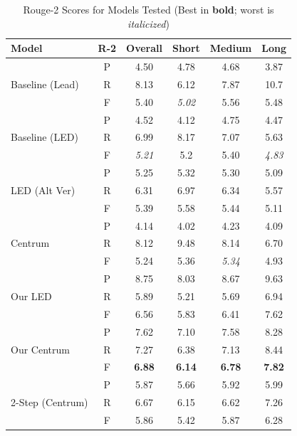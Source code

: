 \documentclass[12pt, twocolumn]{article}
\numberwithin{equation}{section}
\begin{document}
\begin{table}
    \centering
    \footnotesize
    \begin{tabular}{|p{1.5cm}|c|c|c|c|c|}
    \hline
        Model & R-2 & Overall & Short & Medium & Long \\ \hline
        \multirow{3}{1.5cm}{Baseline (Lead)} & P & 4.50 & 4.78 & 4.68 & 3.87 \\ \cline{2-6}
        & R & 8.13 & 6.12 & 7.87 & 10.7 \\ \cline{2-6}
        & F & 5.40 & \textit{5.02} & 5.56 & 5.48 \\ \hline
        \multirow{3}{1.5cm}{Baseline (LED)} & P & 4.52 & 4.12 & 4.75 & 4.47 \\ \cline{2-6}
        ~ & R & 6.99 & 8.17 & 7.07 & 5.63 \\ \cline{2-6}
        ~ & F & \textit{5.21} & 5.2 & 5.40 & \textit{4.83} \\ \hline
        \multirow{3}{1.5cm}{LED (Alt Ver)} & P & 5.25 & 5.32 & 5.30 & 5.09 \\ \cline{2-6}
        ~ & R & 6.31 & 6.97 & 6.34 & 5.57 \\ \cline{2-6}
        ~ & F & 5.39 & 5.58 & 5.44 & 5.11 \\ \hline
        \multirow{3}{1.5cm}{Centrum} & P & 4.14 & 4.02 & 4.23 & 4.09 \\ \cline{2-6}
        ~ & R & 8.12 & 9.48 & 8.14 & 6.70 \\ \cline{2-6}
        ~ & F & 5.24 & 5.36 & \textit{5.34} & 4.93 \\ \hline
        \multirow{3}{1.5cm}{Our LED} & P & 8.75 & 8.03 & 8.67 & 9.63 \\ \cline{2-6}
        ~ & R & 5.89 & 5.21 & 5.69 & 6.94 \\ \cline{2-6}
        ~ & F & 6.56 & 5.83 & 6.41 & 7.62 \\ \hline
        \multirow{3}{1.5cm}{Our Centrum} & P & 7.62 & 7.10 & 7.58 & 8.28 \\ \cline{2-6}
        ~ & R & 7.27 & 6.38 & 7.13 & 8.44 \\ \cline{2-6}
        ~ & F & \textbf{6.88} & \textbf{6.14} & \textbf{6.78} & \textbf{7.82} \\ \hline
        \multirow{3}{1.5cm}{2-Step (Centrum)} & P & 5.87 & 5.66 & 5.92 & 5.99 \\ \cline{2-6}
        ~ & R & 6.67 & 6.15 & 6.62 & 7.26 \\ \cline{2-6}
        ~ & F & 5.86 & 5.42 & 5.87 & 6.28 \\ \hline
    \end{tabular}
    \caption{Rouge-2 Scores for Models Tested (Best in \textbf{bold}; worst is \textit{italicized})}
    \label{tab:rouge-2}
\end{table}
\end{document}
